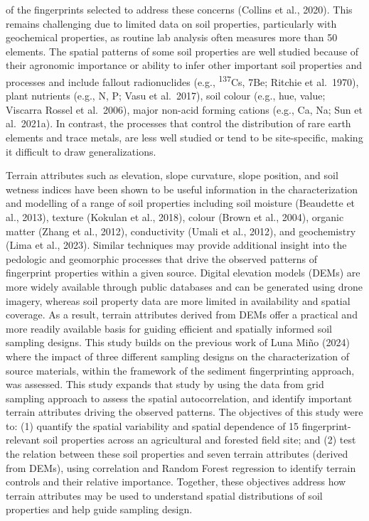 \documentclass[
  number]{elsarticle}
\begin{document}
of the fingerprints selected to address these concerns (Collins et al.,
2020). This remains challenging due to limited data on soil properties,
particularly with geochemical properties, as routine lab analysis often
measures more than 50 elements. The spatial patterns of some soil
properties are well studied because of their agronomic importance or
ability to infer other important soil properties and processes and
include fallout radionuclides (e.g., \textsuperscript{137}Cs, 7Be;
Ritchie et al.~1970), plant nutrients (e.g., N, P; Vasu et al.~2017),
soil colour (e.g., hue, value; Viscarra Rossel et al.~2006), major
non-acid forming cations (e.g., Ca, Na; Sun et al.~2021a). In contrast,
the processes that control the distribution of rare earth elements and
trace metals, are less well studied or tend to be site-specific, making
it difficult to draw generalizations.

Terrain attributes such as elevation, slope curvature, slope position,
and soil wetness indices have been shown to be useful information in the
characterization and modelling of a range of soil properties including
soil moisture (Beaudette et al., 2013), texture (Kokulan et al., 2018),
colour (Brown et al., 2004), organic matter (Zhang et al., 2012),
conductivity (Umali et al., 2012), and geochemistry (Lima et al., 2023).
Similar techniques may provide additional insight into the pedologic and
geomorphic processes that drive the observed patterns of fingerprint
properties within a given source. Digital elevation models (DEMs) are
more widely available through public databases and can be generated
using drone imagery, whereas soil property data are more limited in
availability and spatial coverage. As a result, terrain attributes
derived from DEMs offer a practical and more readily available basis for
guiding efficient and spatially informed soil sampling designs. This
study builds on the previous work of Luna Miño (2024) where the impact
of three different sampling designs on the characterization of source
materials, within the framework of the sediment fingerprinting approach,
was assessed. This study expands that study by using the data from grid
sampling approach to assess the spatial autocorrelation, and identify
important terrain attributes driving the observed patterns. The
objectives of this study were to: (1) quantify the spatial variability
and spatial dependence of 15 fingerprint-relevant soil properties across
an agricultural and forested field site; and (2) test the relation
between these soil properties and seven terrain attributes (derived from
DEMs), using correlation and Random Forest regression to identify
terrain controls and their relative importance. Together, these
objectives address how terrain attributes may be used to understand
spatial distributions of soil properties and help guide sampling design.
\end{document}
